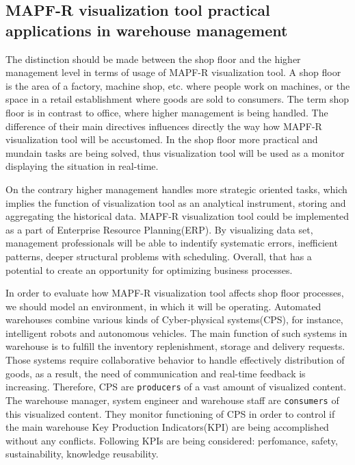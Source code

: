\documentclass[thesis=B,english]{FITthesis}[2019/12/23]
\begin{document}
\subsection{MAPF-R visualization tool practical applications in warehouse management}


The distinction should be made between the shop floor and the higher management level in terms of usage of MAPF-R visualization tool. A shop floor is the area of a factory, machine shop, etc. where people work on machines, or the space in a retail establishment where goods are sold to consumers. The term shop floor is in contrast to office, where higher management is being handled. The difference of their main directives influences directly the way how MAPF-R visualization tool will be accustomed. In the shop floor more practical and mundain tasks are being solved, thus visualization tool will be used as a monitor displaying the situation in real-time. 

On the contrary higher management handles more strategic oriented tasks, which implies the function of visualization tool as an analytical instrument, storing and aggregating the historical data. MAPF-R visualization tool could be implemented as a part of Enterprise Resource Planning(ERP). By visualizing data set, management professionals will be able to indentify systematic errors, inefficient patterns, deeper structural problems with scheduling. Overall, that has a potential to create an opportunity for optimizing business processes.

In order to evaluate how MAPF-R visualization tool affects shop floor processes, we should model an environment, in which it will be operating. Automated warehouses combine various kinds of Cyber-physical systems(CPS), for instance, intelligent robots and autonomous vehicles. The main function of such systems in warehouse is to fulfill the inventory replenishment, storage and delivery requests. Those systems require collaborative behavior to handle effectively distribution of goods, as a result, the need of communication and real-time feedback is increasing. Therefore, CPS are \verb|producers| of a vast amount of visualized content. The warehouse manager, system engineer and warehouse staff are \verb|consumers| of this visualized content. They monitor functioning of CPS in order to control if the main warehouse Key Production Indicators(KPI) are being accomplished without any conflicts. Following KPIs are being considered: perfomance, safety, sustainability, knowledge reusability.\cite{bib_9}
\end{document}
